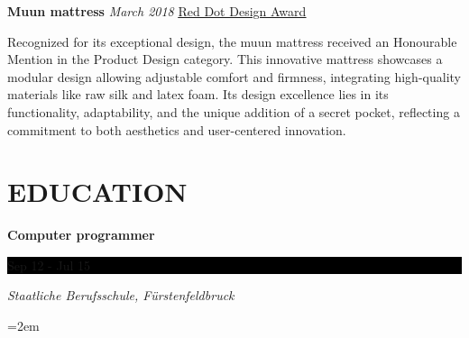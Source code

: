 \documentclass[fontsize=11pt]{article}
\newcommand{\maskedLink}[2]{{\color{blue}\underline{\href{#1}{#2}}}}
\newcommand{\NewPart}[1]{\section*{\uppercase{#1}}}
\newcommand{\EducationEntry}[4]{
    \noindent \textbf{#1} \hfill      %
    \colorbox{Black}{
      \parbox{8.5em}{
      \hfill\color{White}#2}} \par  %
    \noindent \textit{#3} \par        %
    \noindent\hangindent=2em\hangafter=0 \small #4 %
    \normalsize \par}
\newcommand{\AwardEntry}[4]{         %
    \noindent \textbf{#1} \noindent \textit{#3} \hfill {#2} \par
    \noindent \small #4 %
    \normalsize \par}
\begin{document}
\AwardEntry{Muun mattress}{\maskedLink{https://www.red-dot.org/project/muun-7082}{Red Dot Design Award}}
{March 2018}
{Recognized for its exceptional design, the muun mattress received an Honourable Mention in the Product Design category. This innovative mattress showcases a modular design allowing adjustable comfort and firmness, integrating high-quality materials like raw silk and latex foam. Its design excellence lies in its functionality, adaptability, and the unique addition of a secret pocket, reflecting a commitment to both aesthetics and user-centered innovation.}


\NewPart{Education}{}
\EducationEntry
{Computer programmer}
{Sep 12 - Jul 15}
{Staatliche Berufsschule, Fürstenfeldbruck}

\ 
\end{document}
